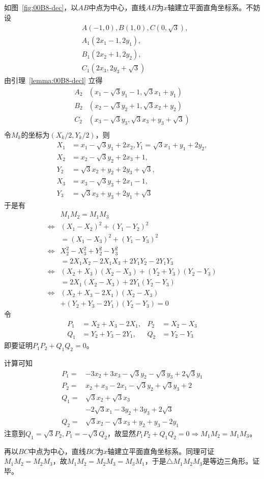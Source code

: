 如图~\ref{fig:00B8-dec}，以$AB$中点为中心，直线$AB$为$x$轴建立平面直角坐标系。不妨设
\begin{align*}
  & A(-1, 0), B(1, 0), C(0, \sqrt3), \\
  & A_1(2x_1 - 1, 2y_1), \\
  & B_1(2x_2 + 1, 2y_2), \\
  & C_1(2x_3, 2y_3 + \sqrt3)
\end{align*}
由引理~\ref{lemma:00B8-decl} 立得
\begin{align*}
  A_2&(x_1 - \sqrt3y_1 - 1, \sqrt3x_1 + y_1) \\
  B_2&(x_2 - \sqrt3y_2 + 1, \sqrt3x_2 + y_2) \\
  C_2&(x_3 - \sqrt3y_3, \sqrt3x_3 + y_3 + \sqrt3) \\
\end{align*}
令$M_k$的坐标为$(X_k/2, Y_k/2)$，则
\begin{align*}
  X_1 &= x_1 - \sqrt3y_1 + 2x_2, Y_1 = \sqrt3x_1 + y_1 + 2y_2, \\
  X_2 &= x_2 - \sqrt3y_2 + 2x_3 + 1, \\
  Y_2 &= \sqrt3x_2 + y_2 + 2y_3 + \sqrt3, \\
  X_3 &= x_3 - \sqrt3y_3 + 2x_1 - 1, \\
  Y_3 &= \sqrt3x_3 + y_3 + 2y_1 + \sqrt3
\end{align*}
于是有
\begin{align*}
  & M_1M_2 = M_1M_3 \\
  \Leftrightarrow{}& (X_1 - X_2)^2 + (Y_1 - Y_2)^2 \\
  &= (X_1 - X_3)^2 + (Y_1 - Y_3)^2 \\
  \Leftrightarrow{}& X_2^2 - X_3^2 + Y_2^2 - Y_3^2 \\
  &= 2X_1X_2 - 2X_1X_3 + 2Y_1Y_2 - 2Y_1Y_3 \\
  \Leftrightarrow{}& (X_2 + X_3)(X_2 - X_3) + (Y_2 + Y_3)(Y_2 - Y_3) \\
  &= 2X_1(X_2 - X_3) + 2Y_1(Y_2 - Y_3) \\
  \Leftrightarrow{}& (X_2 + X_3 - 2X_1)(X_2 - X_3) \\
  &+ (Y_2 + Y_3 - 2Y_1)(Y_2 - Y_3) = 0
\end{align*}
令
\begin{align*}
  P_1 &= X_2 + X_3 - 2X_1, & P_2 &= X_2 - X_3 \\
  Q_1 &= Y_2 + Y_3 - 2Y_1, & Q_2 &= Y_2 - Y_3
\end{align*}
即要证明$P_1P_2 + Q_1Q_2 = 0$。

计算可知
\begin{align*}
  P_1 ={}& -3x_2 + 3x_3 - \sqrt3y_2 - \sqrt3y_3 + 2\sqrt3y_1 \\
  P_2 ={}& x_2 + x_3 - 2x_1 - \sqrt3y_2 + \sqrt3y_3 + 2 \\
  Q_1 ={}& \sqrt3x_2 + \sqrt3x_3 \\
    &- 2\sqrt3x_1 - 3y_2 + 3y_3 + 2\sqrt3 \\
  Q_2 ={}& \sqrt3x_2 - \sqrt3x_3 + y_2 + y_3 - 2y_1
\end{align*}
注意到$Q_1 = \sqrt3P_2, P_1 = -\sqrt3Q_2$，故显然$P_1P_2 + Q_1Q_2 = 0 \Rightarrow M_1M_2 = M_1M_3$。

再以$BC$中点为中心，直线$BC$为$x$轴建立平面直角坐标系。同理可证$M_1M_2 = M_2M_3$，故$M_1M_2 = M_2M_3 = M_3M_1$，于是$\triangle M_1M_2M_3$是等边三角形。证毕。
